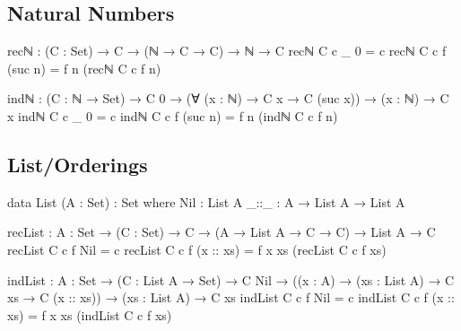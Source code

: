 \documentclass[12pt]{article}
\begin{document}
\subsection*{Natural Numbers}
\begin{center}
\begin{minipage}{0.9\textwidth}
\begin{code}
recℕ : (C : Set) → C → (ℕ → C → C) → ℕ → C
recℕ C c _ 0 = c
recℕ C c f (suc n) = f n (recℕ C c f n) 

indℕ : (C : ℕ → Set) → C 0 →
       (∀ (x : ℕ) → C x → C (suc x)) →
       (x : ℕ) → C x
indℕ C c _ 0 = c
indℕ C c f (suc n) = f n (indℕ C c f n)
\end{code}
\end{minipage}
\end{center}

\subsection*{List/Orderings}
\begin{center}
\begin{minipage}{0.9\textwidth}
\begin{code}
data List (A : Set) : Set where
  Nil  : List A
  _::_ : A → List A → List A

recList : {A : Set} → (C : Set) → C →
          (A → List A → C → C) → List A → C
recList C c f Nil = c
recList C c f (x :: xs) = f x xs (recList C c f xs)

indList : {A : Set} → (C : List A → Set) → C Nil →
          ((x : A) → (xs : List A) → C xs → C (x :: xs)) →
          (xs : List A) → C xs
indList C c f Nil = c
indList C c f (x :: xs) = f x xs (indList C c f xs)
\end{code}
\end{minipage}
\end{center}
\end{document}
